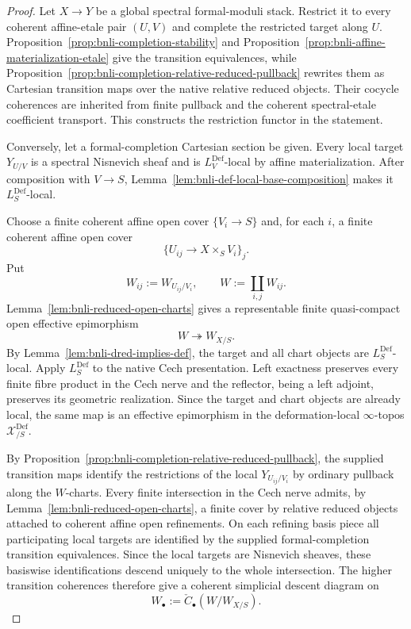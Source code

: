 \begin{proof}
Let $X\to Y$ be a global spectral formal-moduli stack.  Restrict it to every
coherent affine-etale pair $(U,V)$ and complete the restricted target along
$U$.  Proposition~\ref{prop:bnli-completion-stability} and
Proposition~\ref{prop:bnli-affine-materialization-etale} give the transition
equivalences, while
Proposition~\ref{prop:bnli-completion-relative-reduced-pullback} rewrites them
as Cartesian transition maps over the native relative reduced objects.  Their
cocycle coherences are inherited from finite pullback and the coherent
spectral-etale coefficient transport.  This constructs the restriction
functor in the statement.

Conversely, let a formal-completion Cartesian section be given.  Every
local target $Y_{U/V}$ is a spectral Nisnevich sheaf and is
$L_V^{\mathrm{Def}}$-local by affine materialization.  After composition with
$V\to S$, Lemma~\ref{lem:bnli-def-local-base-composition} makes it
$L_S^{\mathrm{Def}}$-local.

Choose a finite coherent affine open cover $\{V_i\to S\}$ and, for each $i$,
a finite coherent affine open cover
\[
    \{U_{ij}\to X\times_SV_i\}_j.
\]
Put
\[
    W_{ij}:=W_{U_{ij}/V_i},
    \qquad
    W:=\coprod_{i,j}W_{ij}.
\]
Lemma~\ref{lem:bnli-reduced-open-charts} gives a representable finite
quasi-compact open effective epimorphism
\[
\boxed{
    W\twoheadrightarrow W_{X/S}.}
\]
By Lemma~\ref{lem:bnli-dred-implies-def}, the target and all chart objects are
$L_S^{\mathrm{Def}}$-local.  Apply $L_S^{\mathrm{Def}}$ to the native Cech
presentation.  Left exactness preserves every finite fibre product in the
Cech nerve and the reflector, being a left adjoint, preserves its geometric
realization.  Since the target and chart objects are already local, the same
map is an effective epimorphism in the deformation-local $\infty$-topos
$\mathcal X^{\mathrm{Def}}_{/S}$.

By Proposition~\ref{prop:bnli-completion-relative-reduced-pullback}, the
supplied transition maps identify the restrictions of the local
$Y_{U_{ij}/V_i}$ by ordinary pullback along the $W$-charts.  Every finite
intersection in the Cech nerve admits, by
Lemma~\ref{lem:bnli-reduced-open-charts}, a finite cover by relative reduced
objects attached to coherent affine open refinements.  On each refining basis
piece all participating local targets are identified by the supplied
formal-completion transition equivalences.  Since the local targets are
Nisnevich sheaves, these basiswise identifications descend uniquely to the
whole intersection.  The higher transition coherences therefore give a
coherent simplicial descent diagram on
\[
    W_\bullet:=\check C_\bullet(W/W_{X/S}).
\]


\end{proof}
